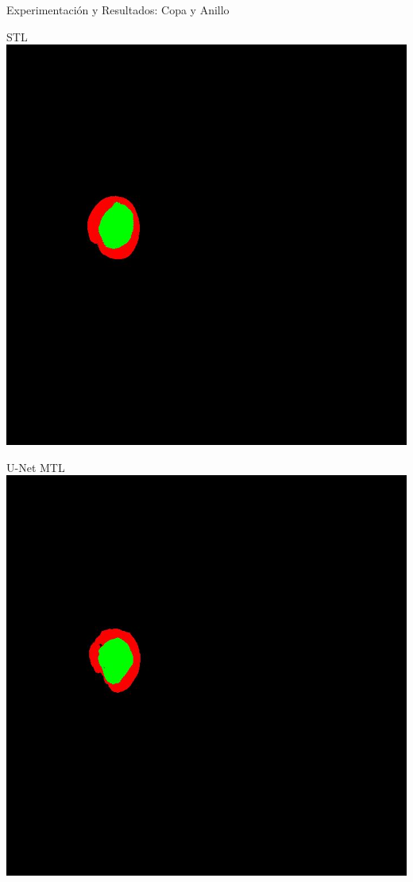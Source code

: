 \documentclass[xcolor=dvipsnames,table]{beamer}
\begin{document}
\begin{frame}{Experimentación y Resultados: Copa y Anillo}
	\centering
	\begin{minipage}[b]{0.13\textwidth}
		\centering
		STL\\[0.2cm]
		\includegraphics[width=\linewidth]{my_images/video/HARDSTL.jpg}
	\end{minipage}\hfill
	\begin{minipage}[b]{0.13\textwidth}
		\centering
		U-Net MTL\\[0.2cm]
		\includegraphics[width=\linewidth]{my_images/video/HARDUNETMTL.jpg}

\end{minipage}
\end{frame}
\end{document}
